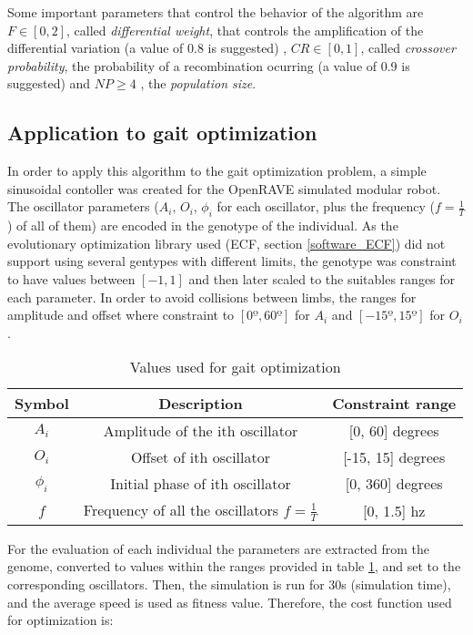Some important parameters that control the behavior of the algorithm are $F \in [0, 2]$, called \emph{differential weight}, that controls the amplification of the differential variation (a value of 0.8 is suggested) , $CR \in [0, 1]$, called \emph{crossover probability}, the probability of a recombination ocurring (a value of 0.9 is suggested) and $NP \geq 4$ , the \emph{population size}.


\subsection{Application to gait optimization}
\label{evolution_gait_opt}

In order to apply this algorithm to the gait optimization problem, a simple sinusoidal contoller was created for the OpenRAVE simulated modular robot. The oscillator parameters ($A_i$, $O_i$, $\phi_i$  for each oscillator, plus the frequency ($f= \frac{1}{T}$) of all of them) are encoded in the genotype of the individual. As the evolutionary optimization library used (ECF, section \ref{software_ECF}) did not support using several gentypes with different limits, the genotype was constraint to have values between $[-1, 1]$ and then later scaled to the suitables ranges for each parameter. In order to avoid collisions between limbs, the ranges for amplitude and offset where constraint to $[0º, 60º]$ for $A_i$ and $[-15º, 15º]$ for $O_i$.\\

\begin{table}[h]
\centering
\begin{tabular}{|c||c|c|} \hline
Symbol & Description & Constraint range \\ \hline \hline
$A_i$ & Amplitude of the ith oscillator & [0, 60] degrees \\ \hline
$O_i$ & Offset of ith oscillator & [-15, 15] degrees \\ \hline
$\phi_i$ & Initial phase of ith oscillator & [0, 360] degrees \\ \hline
$f$ & Frequency of all the oscillators $ f=\frac{1}{T}$ &  [0, 1.5] hz \\ \hline

\end{tabular}
\caption{Values used for gait optimization}
\label{tab:osc_constraints}
\end{table}


For the evaluation of each individual the parameters are extracted from the genome, converted to values within the ranges provided in table \ref{tab:osc_constraints}, and set to the corresponding oscillators. Then, the simulation is run for 30s (simulation time), and the average speed is used as fitness value. Therefore, the cost function used for optimization is:

